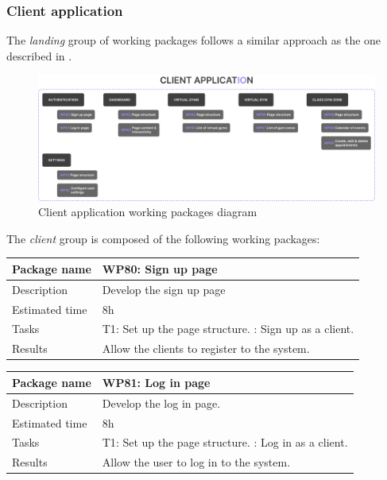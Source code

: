 \documentclass[a4paper, 12pt, oneside]{book}
\begin{document}
\subsubsection{Client application}
The \emph{landing} group of working packages follows a similar approach as the one described in .
\begin{figure}[H]
	\centering
	\includegraphics[width=\textwidth]{assets/working-packages/Client.png}
	\caption{Client application working packages diagram}
\end{figure}
The \emph{client} group is composed of the following working packages:
\\[8pt]
\begin{tabularx}{\textwidth}{| l | X |}
	\hline
	\rowcolor{rowColor}
	{\semibf Package name}   & {\semibf WP80}: Sign up page                 \\
	\hline
	{\semibf Description}    & Develop the sign up page                     \\
	\hline
	\rowcolor{rowColor}
	{\semibf Estimated time} & 8h                                           \\
	\hline
	{\semibf Tasks}          & {\semibf T1}: Set up the page structure.
	\newline {\semibf T2}: Sign up as a client.                             \\
	\hline
	\rowcolor{rowColor}
	{\semibf Results}        & Allow the clients to register to the system. \\
	\hline
\end{tabularx}
\vspace*{16pt}
\begin{tabularx}{\textwidth}{| l | X |}
	\hline
	\rowcolor{rowColor}
	{\semibf Package name}   & {\semibf WP81}: Log in page              \\
	\hline
	{\semibf Description}    & Develop the log in page.                 \\
	\hline
	\rowcolor{rowColor}
	{\semibf Estimated time} & 8h                                       \\
	\hline
	{\semibf Tasks}          & {\semibf T1}: Set up the page structure.
	\newline {\semibf T2}: Log in as a client.                          \\
	\hline
	\rowcolor{rowColor}
	{\semibf Results}        & Allow the user to log in to the system.  \\
	\hline
\end{tabularx}
\end{document}

